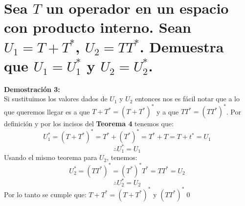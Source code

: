 \section{Sea $T$ un operador en un espacio con producto interno. Sean $U_1=T+T^*$, $U_2=TT^*$. Demuestra que $U_1=U_1^*$  y $U_2=U_2^*$.}
\textbf{Demostraci\'on 3:}\\
Si sustituimos los valores dados de $U_1$ y $U_2$ entonces nos es f\'acil notar que a lo que queremos llegar es a que $T+T^*=(T+T^*)^*$ y a que $TT^*=(TT^*)^*$. Por definici\'on y por los incisos del \textbf{Teorema 4} tenemos que: 
\[U_1^*=(T+T^*)^* = T^* + (T^*)^*=T^*+T=T+t^*=U_1\]
\[\therefore U_1^*=U_1\]
Usando el mismo teorema para $U_2$, tenemos:
\[U_2^*=(TT^*)^*=(T^*)^*T^*=TT^*=U_2\]
\[\therefore U_2^*=U_2\]
Por lo tanto se cumple que:  $T+T^*=(T+T^*)^*$ y $(TT^*)^*$\qed














 